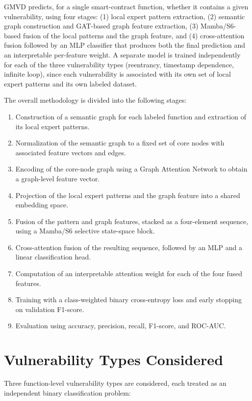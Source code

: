 \documentclass[12pt, a4paper, openright, twoside]{report}
\begin{document}
GMVD predicts, for a single smart-contract function, whether it contains a given vulnerability, using four stages: (1) local expert pattern extraction, (2) semantic graph construction and GAT-based graph feature extraction, (3) Mamba/S6-based fusion of the local patterns and the graph feature, and (4) cross-attention fusion followed by an MLP classifier that produces both the final prediction and an interpretable per-feature weight. A separate model is trained independently for each of the three vulnerability types (reentrancy, timestamp dependence, infinite loop), since each vulnerability is associated with its own set of local expert patterns and its own labeled dataset.

The overall methodology is divided into the following stages:

\begin{enumerate}
    \item Construction of a semantic graph for each labeled function and extraction of its local expert patterns.
    \item Normalization of the semantic graph to a fixed set of core nodes with associated feature vectors and edges.
    \item Encoding of the core-node graph using a Graph Attention Network to obtain a graph-level feature vector.
    \item Projection of the local expert patterns and the graph feature into a shared embedding space.
    \item Fusion of the pattern and graph features, stacked as a four-element sequence, using a Mamba/S6 selective state-space block.
    \item Cross-attention fusion of the resulting sequence, followed by an MLP and a linear classification head.
    \item Computation of an interpretable attention weight for each of the four fused features.
    \item Training with a class-weighted binary cross-entropy loss and early stopping on validation F1-score.
    \item Evaluation using accuracy, precision, recall, F1-score, and ROC-AUC.
\end{enumerate}

\section{Vulnerability Types Considered}

Three function-level vulnerability types are considered, each treated as an independent binary classification problem:
\end{document}
